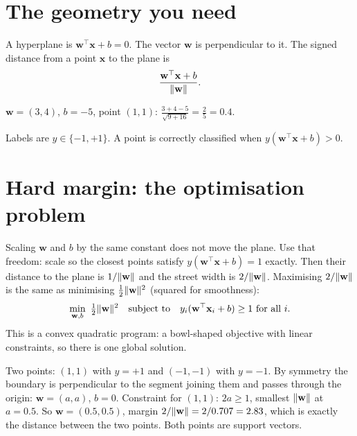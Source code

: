 \section{The geometry you need}
A hyperplane is $\mathbf w^\top\mathbf x + b = 0$. The vector $\mathbf w$ is perpendicular to it. The signed distance from a point
$\mathbf x$ to the plane is
\[ \frac{\mathbf w^\top\mathbf x + b}{\lVert \mathbf w\rVert}. \]
\begin{example}
$\mathbf w = (3, 4)$, $b = -5$, point $(1, 1)$: $\frac{3 + 4 - 5}{\sqrt{9+16}} = \frac{2}{5} = 0.4$.
\end{example}
Labels are $y\in\{-1,+1\}$. A point is correctly classified when $y(\mathbf w^\top\mathbf x + b) > 0$.

\section{Hard margin: the optimisation problem}
Scaling $\mathbf w$ and $b$ by the same constant does not move the plane. Use that freedom: scale so the closest points satisfy
$y(\mathbf w^\top\mathbf x + b) = 1$ exactly. Then their distance to the plane is $1/\lVert \mathbf w\rVert$ and the street width is
$2/\lVert \mathbf w\rVert$. Maximising $2/\lVert \mathbf w\rVert$ is the same as minimising $\frac12\lVert \mathbf w\rVert^2$ (squared for smoothness):
\[ \min_{\mathbf w,b}\ \tfrac12\lVert \mathbf w\rVert^2\quad\text{subject to}\quad y_i(\mathbf w^\top\mathbf x_i + b)\ge1\ \text{for all } i. \]
This is a convex quadratic program: a bowl-shaped objective with linear constraints, so there is one global solution.

\begin{example}
Two points: $(1,1)$ with $y = +1$ and $(-1,-1)$ with $y = -1$. By symmetry the boundary is perpendicular to the segment joining
them and passes through the origin: $\mathbf w = (a, a)$, $b = 0$. Constraint for $(1,1)$: $2a \ge 1$, smallest $\lVert \mathbf w\rVert$ at
$a = 0.5$. So $\mathbf w = (0.5, 0.5)$, margin $2/\lVert \mathbf w\rVert = 2/0.707 = 2.83$, which is exactly the distance between the two
points. Both points are support vectors.
\end{example}

